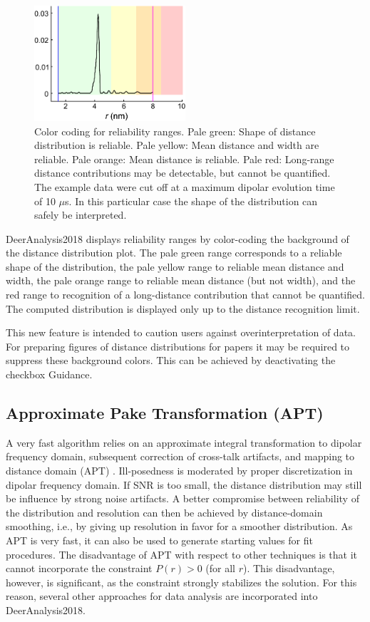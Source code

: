 \documentclass{article}
\begin{document}
\begin{figure}[ht]
 	\begin{center}
  \includegraphics[width=0.5\textwidth]{fig_reliability.pdf}
	\end{center}
	\caption{Color coding for reliability ranges. Pale green: Shape of distance distribution is reliable. Pale yellow: Mean distance and width are reliable. Pale orange: Mean distance is reliable. Pale red: Long-range distance contributions may be detectable, but cannot be quantified. The example data were cut off at a maximum dipolar evolution time of 10 $\mu$s. In this particular case the shape of the distribution can safely be interpreted.}
	\label{fig:reliability}
\end{figure}

DeerAnalysis2018 displays reliability ranges by color-coding the background of the distance distribution plot. The pale green range
corresponds to a reliable shape of the distribution, the pale yellow range to reliable mean distance and width, the pale orange range to 
reliable mean distance (but not width), and the red range to recognition of a long-distance contribution that cannot be quantified. The computed distribution is displayed only up to the distance recognition limit.

This new feature is intended to caution users against overinterpretation of data. For preparing figures of distance distributions for papers it may be required to suppress these background colors. This can be achieved by deactivating the checkbox {\ttfamily Guidance}.

\subsection{Approximate Pake Transformation (APT)}
A very fast algorithm relies on an approximate integral transformation to
dipolar frequency domain, subsequent correction of cross-talk artifacts, and
mapping to distance domain (APT) \cite{jeschke2001}. Ill-posedness is moderated by proper
discretization in dipolar frequency domain. If SNR is too small, the distance
distribution may still be influence by strong noise artifacts. A better
compromise between reliability of the distribution and resolution can then be
achieved by distance-domain smoothing, i.e., by giving up resolution in favor
for a smoother distribution. As APT is very fast, it can also be used to generate
starting values for fit procedures. The disadvantage of APT with respect
to other techniques is that it cannot incorporate the constraint $P(r) > 0$ (for
all $r$). This disadvantage, however, is significant, as the constraint strongly
stabilizes the solution. For this reason, several other approaches for data analysis
are incorporated into DeerAnalysis2018.
\end{document}
